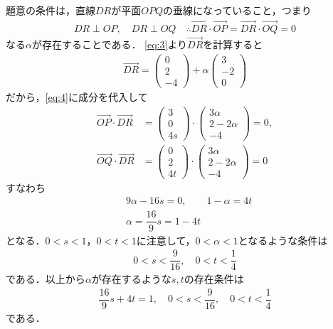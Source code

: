 \documentclass[../../main.tex]{subfiles}
\begin{document}
題意の条件は，直線$DR$が平面$OPQ$の垂線になっていること，つまり
\begin{align}
  DR\perp OP, \quad DR\perp OQ \quad \therefore
  \overrightarrow{DR}\cdot\overrightarrow{OP} = \overrightarrow{DR}\cdot\overrightarrow{OQ} = 0 \label{eq:4}
\end{align}
なる$\alpha$が存在することである．
\cref{eq:3}より$\overrightarrow{DR}$を計算すると
\begin{align}
  \overrightarrow{DR}=
  \begin{pmatrix}0\\2\\-4
  \end{pmatrix}
  +\alpha
  \begin{pmatrix}3\\-2\\0
  \end{pmatrix}
\end{align}
だから，\cref{eq:4}に成分を代入して
\begin{align}
  \overrightarrow{OP}\cdot\overrightarrow{DR}
  &=
  \begin{pmatrix}3\\0\\4s
  \end{pmatrix}\cdot
  \begin{pmatrix}3\alpha\\2-2\alpha\\-4
  \end{pmatrix}=0,\\
  \overrightarrow{OQ}\cdot\overrightarrow{DR}
  &=
  \begin{pmatrix}0\\2\\4t
  \end{pmatrix}\cdot
  \begin{pmatrix}3\alpha\\2-2\alpha\\-4
  \end{pmatrix}=0
\end{align}
すなわち
\begin{align}
  & 9\alpha-16s=0,\qquad 1-\alpha=4t \\
  & \alpha=\dfrac{16}{9}s=1-4t
\end{align}
となる．$0<s<1$，$0<t<1$に注意して，$0<\alpha<1$となるような条件は
\begin{align}
  0 < s <\dfrac{9}{16}, \quad
  0< t < \dfrac{1}{4}
\end{align}
である．以上から$\alpha$が存在するような$s,t$の存在条件は
\begin{align}
  \dfrac{16}{9}s+4t=1, \quad
  0 < s <\dfrac{9}{16}, \quad
  0< t < \dfrac{1}{4}
\end{align}
である．
\end{document}
